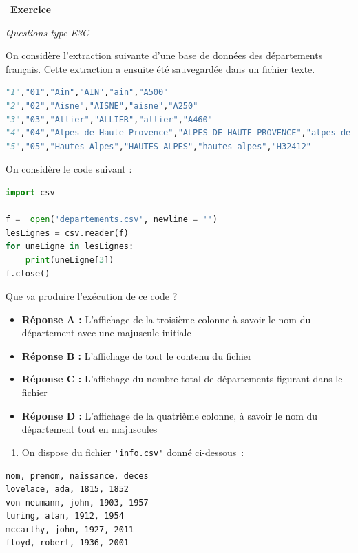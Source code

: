 \documentclass[
  11pt,
]{article}
\newcommand{\passthrough}[1]{#1}
\providecommand{\tightlist}{%
  \setlength{\itemsep}{0pt}\setlength{\parskip}{0pt}}
\newcounter{exo}
\newenvironment{exercice}[1]
{\par \medskip   \addtocounter{exo}{1} \noindent  
\begin{bclogo}[arrondi =0.1,   noborder = true, logo=\bccrayon, marge=4]{~\textbf{Exercice} \textbf{\theexo} {\itshape #1} }  \par}
{
\end{bclogo}
 \par \bigskip }
\newcounter{def}
\begin{document}
\begin{exercice}{}

\emph{Questions type E3C}

On considère l'extraction suivante d'une base de données des
départements français. Cette extraction a ensuite été sauvegardée dans
un fichier texte.

\begin{lstlisting}[language=Python]
"1","01","Ain","AIN","ain","A500"
"2","02","Aisne","AISNE","aisne","A250"
"3","03","Allier","ALLIER","allier","A460"
"4","04","Alpes-de-Haute-Provence","ALPES-DE-HAUTE-PROVENCE","alpes-de-haute-provence","A412316152"
"5","05","Hautes-Alpes","HAUTES-ALPES","hautes-alpes","H32412"
\end{lstlisting}

On considère le code suivant :

\begin{lstlisting}[language=Python]
import csv

f =  open('departements.csv', newline = '')
lesLignes = csv.reader(f)
for uneLigne in lesLignes:
    print(uneLigne[3])
f.close()
\end{lstlisting}

Que va produire l'exécution de ce code ?

\begin{itemize}
\tightlist
\item
  \textbf{Réponse A :} L'affichage de la troisième colonne à savoir le
  nom du département avec une majuscule initiale
\item
  \textbf{Réponse B :} L'affichage de tout le contenu du fichier
\item
  \textbf{Réponse C :} L'affichage du nombre total de départements
  figurant dans le fichier
\item
  \textbf{Réponse D :} L'affichage de la quatrième colonne, à savoir le
  nom du département tout en majuscules
\end{itemize}

\begin{enumerate}
\def\labelenumi{\arabic{enumi}.}
\setcounter{enumi}{1}
\tightlist
\item
  On dispose du fichier \passthrough{\lstinline!'info.csv'!} donné
  ci-dessous~:
\end{enumerate}

\begin{lstlisting}
nom, prenom, naissance, deces
lovelace, ada, 1815, 1852
von neumann, john, 1903, 1957
turing, alan, 1912, 1954
mccarthy, john, 1927, 2011
floyd, robert, 1936, 2001
\end{lstlisting}


\end{exercice}
\end{document}
